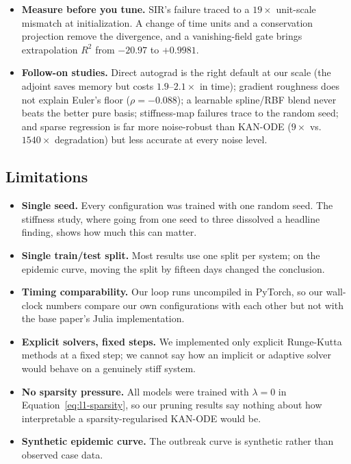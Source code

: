 \begin{itemize}[leftmargin=1.2em]
  initialization.
\item \textbf{Measure before you tune.} SIR's failure traced to a $19\times$
  unit-scale mismatch at initialization. A change of time units and a
  conservation projection remove the divergence, and a vanishing-field gate
  brings extrapolation $R^2$ from $-20.97$ to $+0.9981$.
\item \textbf{Follow-on studies.} Direct autograd is the right default at
  our scale (the adjoint saves memory but costs $1.9$--$2.1\times$ in time);
  gradient roughness does not explain Euler's floor ($\rho=-0.088$); a
  learnable spline/RBF blend never beats the better pure basis;
  stiffness-map failures trace to the random seed; and sparse regression is
  far more noise-robust than KAN-ODE ($9\times$ vs.\ $1540\times$
  degradation) but less accurate at every noise level.
\end{itemize}

\subsection{Limitations}

\begin{itemize}[leftmargin=1.2em]
\item \textbf{Single seed.} Every configuration was trained with one random
  seed. The stiffness study, where going from one seed to three dissolved a
  headline finding, shows how much this can matter.
\item \textbf{Single train/test split.} Most results use one split per
  system; on the epidemic curve, moving the split by fifteen days changed
  the conclusion.
\item \textbf{Timing comparability.} Our loop runs uncompiled in PyTorch, so
  our wall-clock numbers compare our own configurations with each other but
  not with the base paper's Julia implementation.
\item \textbf{Explicit solvers, fixed steps.} We implemented only explicit
  Runge-Kutta methods at a fixed step; we cannot say how an implicit or
  adaptive solver would behave on a genuinely stiff system.
\item \textbf{No sparsity pressure.} All models were trained with
  $\lambda=0$ in Equation~\ref{eq:l1-sparsity}, so our pruning results say
  nothing about how interpretable a sparsity-regularised KAN-ODE would be.
\item \textbf{Synthetic epidemic curve.} The outbreak curve is synthetic
  rather than observed case data.
\end{itemize}

